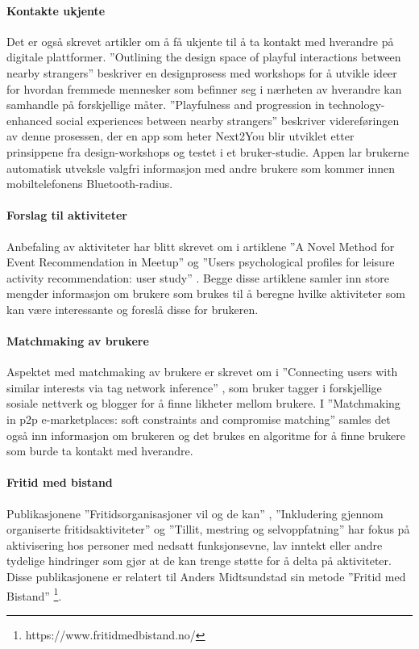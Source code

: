 \paragraph{Kontakte ukjente}
Det er også skrevet artikler om å få ukjente til å ta kontakt med hverandre på digitale plattformer. ''Outlining the design space of playful interactions between nearby strangers'' \cite{NEARBY:5:AM16} beskriver en designprosess med workshops for å utvikle ideer for hvordan fremmede mennesker som befinner seg i nærheten av hverandre kan samhandle på forskjellige måter. ''Playfulness and progression in technology-enhanced social experiences between nearby strangers'' \cite{PLAYFUL:6:NORDICHI18} beskriver videreføringen av denne prosessen, der en app som heter Next2You blir utviklet etter prinsippene fra design-workshops og testet i et bruker-studie. Appen lar brukerne automatisk utveksle valgfri informasjon med andre brukere som kommer innen mobiltelefonens Bluetooth-radius.

\paragraph{Forslag til aktiviteter}
Anbefaling av aktiviteter har blitt skrevet om i artiklene ''A Novel Method for Event Recommendation in Meetup'' \cite{MEETUP:7:ASONAM17} og ''Users psychological profiles for leisure activity recommendation: user study'' \cite{PROFILES:10:CITREC17}. Begge disse artiklene samler inn store mengder informasjon om brukere som brukes til å beregne hvilke aktiviteter som kan være interessante og foreslå disse for brukeren.

\paragraph{Matchmaking av brukere}
Aspektet med matchmaking av brukere er skrevet om i ''Connecting users with similar interests via tag network inference'' \cite{TAGNETWORK:8:CIKM11}, som bruker tagger i forskjellige sosiale nettverk og blogger for å finne likheter mellom brukere. I ''Matchmaking in p2p e-marketplaces: soft constraints and compromise matching'' \cite{MATCHMAKING:9:ICEC10} samles det også inn informasjon om brukeren og det brukes en algoritme for å finne brukere som burde ta kontakt med hverandre.

\paragraph{Fritid med bistand}
Publikasjonene ''Fritidsorganisasjoner vil og de kan'' \cite{FRITID:12}, ''Inkludering gjennom organiserte fritidsaktiviteter'' \cite{INKLUDERING:11} og ''Tillit, mestring og selvoppfatning'' \cite{TILLIT:13} har fokus på aktivisering hos personer med nedsatt funksjonsevne, lav inntekt eller andre tydelige hindringer som gjør at de kan trenge støtte for å delta på aktiviteter. Disse publikasjonene er relatert til Anders Midtsundstad sin metode ''Fritid med Bistand'' \footnote{https://www.fritidmedbistand.no/}. 
